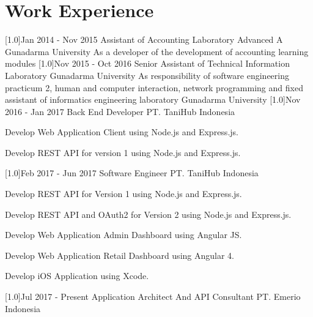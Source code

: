\documentclass[english]{cv-style}
\begin{document}
\section{Work Experience}
  \vspace{-0.3cm}
\begin{entrylist}
\entry
  {\scalebox{.6}[1.0]{Jan 2014 - Nov 2015}}
  {Assistant of Accounting Laboratory Advanced A}
  {Gunadarma University}
  {As a developer of the development of accounting learning modules}
\entry
  {\scalebox{.6}[1.0]{Nov 2015 - Oct 2016}}
  {Senior Assistant of Technical Information Laboratory}
  {Gunadarma University}
  {As responsibility of software engineering practicum 2, human and computer interaction, network programming and fixed assistant of informatics engineering laboratory Gunadarma University}
\entry
  {\scalebox{.6}[1.0]{Nov 2016 - Jan 2017}}
  {Back End Developer}
  {PT. TaniHub Indonesia}
  {\vspace{-0.3cm}
  \begin{itemize}\small{
    \item Develop Web Application Client using Node.js and Express.js.
    \item Develop REST API for version 1 using Node.js and Express.js.}
  \end{itemize}}
\entry
  {\scalebox{.6}[1.0]{Feb 2017 - Jun 2017}}
  {Software Engineer}
  {PT. TaniHub Indonesia}
  {\vspace{-0.3cm}
  \begin{itemize}\small{
    \item Develop REST API for Version 1 using Node.js and Express.js.
    \item Develop REST API and OAuth2 for Version 2 using Node.js and Express.js.
    \item Develop Web Application Admin Dashboard using Angular JS.
    \item Develop Web Application Retail Dashboard using Angular 4.
    \item Develop iOS Application using Xcode.}
  \end{itemize}}
\entry
  {\scalebox{.6}[1.0]{Jul 2017 - Present}}
  {Application Architect And API Consultant}
  {PT. Emerio Indonesia}
  {\vspace{-0.3cm}
  \begin{itemize}\small{
}
\end{itemize}}
\end{entrylist}
\end{document}
